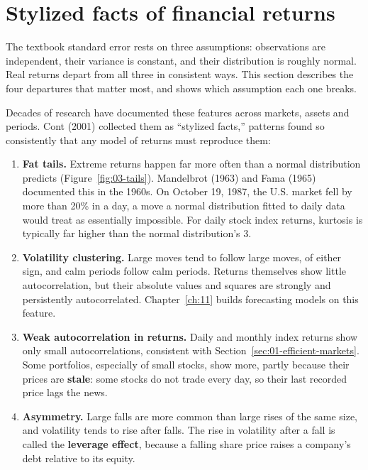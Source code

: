 \section{Stylized facts of financial returns}
\label{sec:03-facts}

The textbook standard error rests on three assumptions: observations are
independent, their variance is constant, and their distribution is roughly
normal. Real returns depart from all three in consistent ways. This section
describes the four departures that matter most, and shows which assumption each
one breaks.

Decades of research have documented these features across markets, assets and
periods. Cont (2001) collected them as ``stylized facts,'' patterns found so
consistently that any model of returns must reproduce them:

\begin{enumerate}
  \item \textbf{Fat tails.} Extreme returns happen far more often than a normal distribution predicts (Figure~\ref{fig:03-tails}). Mandelbrot (1963) and Fama (1965) documented this in the 1960s. On October 19, 1987, the U.S. market fell by more than 20\% in a day, a move a normal distribution fitted to daily data would treat as essentially impossible. For daily stock index returns, kurtosis is typically far higher than the normal distribution's 3.
  \item \textbf{Volatility clustering.} Large moves tend to follow large moves, of either sign, and calm periods follow calm periods. Returns themselves show little autocorrelation, but their absolute values and squares are strongly and persistently autocorrelated. Chapter~\ref{ch:11} builds forecasting models on this feature.
  \item \textbf{Weak autocorrelation in returns.} Daily and monthly index returns show only small autocorrelations, consistent with Section~\ref{sec:01-efficient-markets}. Some portfolios, especially of small stocks, show more, partly because their prices are \textbf{stale}: some stocks do not trade every day, so their last recorded price lags the news.
  \item \textbf{Asymmetry.} Large falls are more common than large rises of the same size, and volatility tends to rise after falls. The rise in volatility after a fall is called the \textbf{leverage effect}, because a falling share price raises a company's debt relative to its equity.
\end{enumerate}

